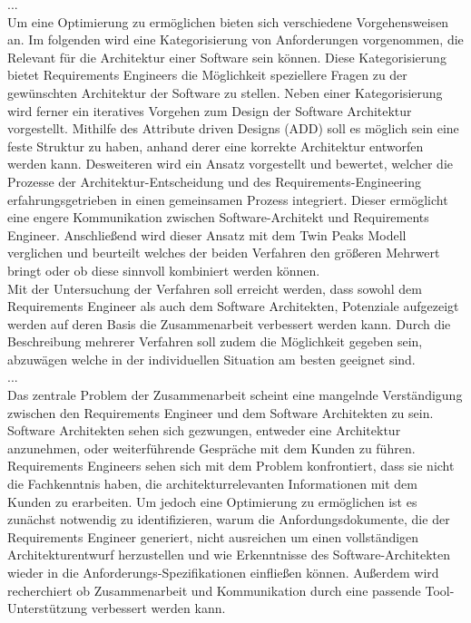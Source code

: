 ...\\

Um eine Optimierung zu ermöglichen bieten sich verschiedene Vorgehensweisen an. Im folgenden wird eine Kategorisierung von Anforderungen vorgenommen, die Relevant für die Architektur einer Software sein können. Diese Kategorisierung bietet Requirements Engineers die Möglichkeit speziellere Fragen zu der gewünschten Architektur der Software zu stellen. Neben einer Kategorisierung wird ferner ein iteratives Vorgehen zum Design der Software Architektur vorgestellt. Mithilfe des Attribute driven Designs (ADD) soll es möglich sein eine feste Struktur zu haben, anhand derer eine korrekte Architektur entworfen werden kann. Desweiteren wird ein Ansatz vorgestellt und bewertet, welcher die Prozesse der Architektur-Entscheidung und des Requirements-Engineering erfahrungsgetrieben in einen gemeinsamen Prozess integriert. Dieser ermöglicht eine engere Kommunikation zwischen Software-Architekt und Requirements Engineer. Anschließend wird dieser Ansatz mit dem Twin Peaks Modell verglichen und beurteilt welches der beiden Verfahren den größeren Mehrwert bringt oder ob diese sinnvoll kombiniert werden können.\\

Mit der Untersuchung der Verfahren soll erreicht werden, dass sowohl dem Requirements Engineer als auch dem Software Architekten, Potenziale aufgezeigt werden auf deren Basis die Zusammenarbeit verbessert werden kann. Durch die Beschreibung mehrerer Verfahren soll zudem die Möglichkeit gegeben sein, abzuwägen welche in der individuellen Situation am besten geeignet sind. \\

...\\

Das zentrale Problem der Zusammenarbeit scheint eine mangelnde Verständigung zwischen den Requirements Engineer und dem Software Architekten zu sein. Software Architekten sehen sich gezwungen, entweder eine Architektur anzunehmen, oder weiterführende Gespräche mit dem Kunden zu führen. Requirements Engineers sehen sich mit dem Problem konfrontiert, dass sie nicht die Fachkenntnis haben, die architekturrelevanten Informationen mit dem Kunden zu erarbeiten. Um jedoch eine Optimierung zu ermöglichen ist es zunächst notwendig zu identifizieren, warum die Anfordungsdokumente, die der Requirements Engineer generiert, nicht ausreichen um einen vollständigen Architekturentwurf herzustellen und wie Erkenntnisse des Software-Architekten wieder in die Anforderungs-Spezifikationen einfließen können. Außerdem wird recherchiert ob Zusammenarbeit und Kommunikation durch eine passende Tool-Unterstützung verbessert werden kann.\\
